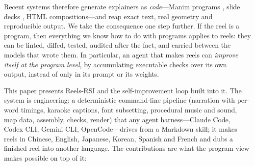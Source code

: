 \documentclass[11pt]{article}
\newcommand{\sys}{Reels-RSI}
\begin{document}
Recent systems therefore generate explainers as \emph{code}---Manim programs
\citep{theoremexplain2025,code2video2026,manimagent2026}, slide decks \citep{paper2video2025}, HTML
compositions---and reap exact text, real geometry and reproducible output. We take the consequence
one step further. If the reel is a program, then everything we know how to do with programs applies
to reels: they can be linted, diffed, tested, audited after the fact, and carried between the
models that wrote them. In particular, an agent that makes reels can \emph{improve itself at the
program level}, by accumulating executable checks over its own output, instead of only in its
prompt or its weights.

This paper presents \sys{} and the self-improvement loop built into it. The system is engineering:
a deterministic command-line pipeline (narration with per-word timings, karaoke captions, font
subsetting, procedural music and sound, map data, assembly, checks, render) that any agent
harness---Claude Code, Codex CLI, Gemini CLI, OpenCode---drives from a Markdown skill; it makes
reels in Chinese, English, Japanese, Korean, Spanish and French and dubs a finished reel into
another language. The contributions are what the program view makes possible on top of it:
\end{document}
